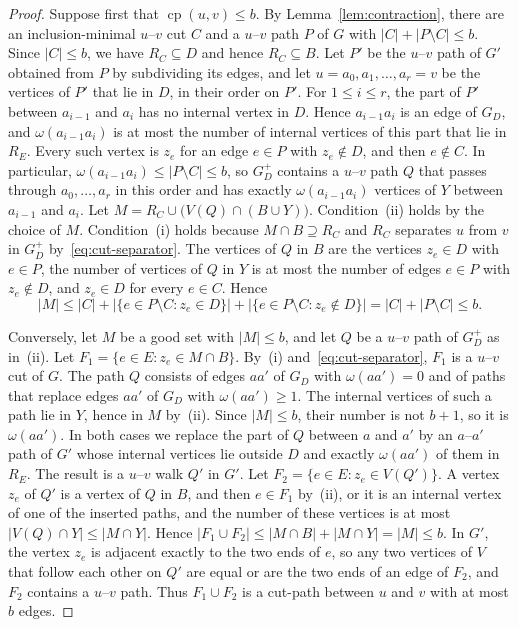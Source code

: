 \documentclass[a4paper,fleqn]{cas-sc}
\numberwithin{equation}{section}
\theoremstyle{definition}
\theoremstyle{plain}
\theoremstyle{remark}
\newcommand{\cp}{\operatorname{cp}}                  %
\begin{document}
\begin{proof}
Suppose first that $\cp(u,v) \leq b$.
By Lemma~\ref{lem:contraction}, there are an inclusion-minimal $u$--$v$ cut $C$ and a $u$--$v$ path $P$ of $G$ with $|C| + |P \setminus C| \leq b$.
Since $|C| \leq b$, we have $R_C \subseteq D$ and hence $R_C \subseteq B$.
Let $P'$ be the $u$--$v$ path of $G'$ obtained from $P$ by subdividing its edges, and let $u = a_0, a_1, \dots, a_r = v$ be the vertices of $P'$ that lie in $D$, in their order on $P'$.
For $1 \leq i \leq r$, the part of $P'$ between $a_{i-1}$ and $a_i$ has no internal vertex in $D$.
Hence $a_{i-1}a_i$ is an edge of $G_D$, and $\omega(a_{i-1}a_i)$ is at most the number of internal vertices of this part that lie in $R_E$.
Every such vertex is $z_e$ for an edge $e \in P$ with $z_e \notin D$, and then $e \notin C$.
In particular, $\omega(a_{i-1}a_i) \leq |P \setminus C| \leq b$, so $G_D^+$ contains a $u$--$v$ path $Q$ that passes through $a_0, \dots, a_r$ in this order and has exactly $\omega(a_{i-1}a_i)$ vertices of $Y$ between $a_{i-1}$ and $a_i$.
Let $M = R_C \cup \bigl(V(Q) \cap (B \cup Y)\bigr)$.
Condition~(ii) holds by the choice of $M$.
Condition~(i) holds because $M \cap B \supseteq R_C$ and $R_C$ separates $u$ from $v$ in $G_D^+$ by~\eqref{eq:cut-separator}.
The vertices of $Q$ in $B$ are the vertices $z_e \in D$ with $e \in P$, the number of vertices of $Q$ in $Y$ is at most the number of edges $e \in P$ with $z_e \notin D$, and $z_e \in D$ for every $e \in C$.
Hence
\[
|M| \leq |C| + |\{e \in P \setminus C : z_e \in D\}| + |\{e \in P \setminus C : z_e \notin D\}| = |C| + |P \setminus C| \leq b.
\]

Conversely, let $M$ be a good set with $|M| \leq b$, and let $Q$ be a $u$--$v$ path of $G_D^+$ as in~(ii).
Let $F_1 = \{e \in E : z_e \in M \cap B\}$.
By~(i) and~\eqref{eq:cut-separator}, $F_1$ is a $u$--$v$ cut of $G$.
The path $Q$ consists of edges $aa'$ of $G_D$ with $\omega(aa') = 0$ and of paths that replace edges $aa'$ of $G_D$ with $\omega(aa') \geq 1$.
The internal vertices of such a path lie in $Y$, hence in $M$ by~(ii).
Since $|M| \leq b$, their number is not $b+1$, so it is $\omega(aa')$.
In both cases we replace the part of $Q$ between $a$ and $a'$ by an $a$--$a'$ path of $G'$ whose internal vertices lie outside $D$ and exactly $\omega(aa')$ of them in $R_E$.
The result is a $u$--$v$ walk $Q'$ in $G'$.
Let $F_2 = \{e \in E : z_e \in V(Q')\}$.
A vertex $z_e$ of $Q'$ is a vertex of $Q$ in $B$, and then $e \in F_1$ by~(ii), or it is an internal vertex of one of the inserted paths, and the number of these vertices is at most $|V(Q) \cap Y| \leq |M \cap Y|$.
Hence $|F_1 \cup F_2| \leq |M \cap B| + |M \cap Y| = |M| \leq b$.
In $G'$, the vertex $z_e$ is adjacent exactly to the two ends of $e$, so any two vertices of $V$ that follow each other on $Q'$ are equal or are the two ends of an edge of $F_2$, and $F_2$ contains a $u$--$v$ path.
Thus $F_1 \cup F_2$ is a cut-path between $u$ and $v$ with at most $b$ edges.
\end{proof}
\end{document}
